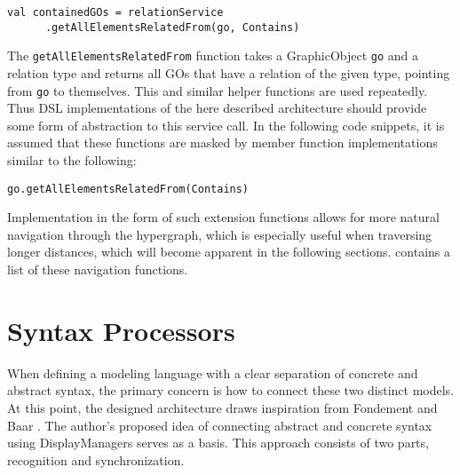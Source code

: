 \begin{lstlisting}[language=customLang, caption={Example of how to get all GOs contained by a given element \texttt{go} in the \textsc{CouchEdit} architecture}, captionpos=b]
val containedGOs = relationService
      .getAllElementsRelatedFrom(go, Contains) 
\end{lstlisting}

The \texttt{getAllElementsRelatedFrom} function takes a GraphicObject \texttt{go} and a relation type and returns all GOs that have a relation of the given type, pointing from \texttt{go} to themselves. This and similar helper functions are used repeatedly. Thus DSL implementations of the here described architecture should provide some form of abstraction to this service call. In the following code snippets, it is assumed that these functions are masked by member function implementations similar to the following:

\begin{lstlisting}[caption={The \texttt{getAllElementsRelatedFrom} function, implemented as a member function, eases navigation through the hypergraph.}, captionpos=b]
go.getAllElementsRelatedFrom(Contains)
\end{lstlisting}

Implementation in the form of such extension functions allows for more natural navigation through the hypergraph, which is especially useful when traversing longer distances, which will become apparent in the following sections.  contains a list of these navigation functions.


\section{Syntax Processors}
When defining a modeling language with a clear separation of concrete and abstract syntax, the primary concern is how to connect these two distinct models. At this point, the designed architecture draws inspiration from Fondement and Baar \cite{fondement_making_2005}. The author's proposed idea of connecting abstract and concrete syntax using DisplayManagers serves as a basis. This approach consists of two parts, recognition and synchronization.

